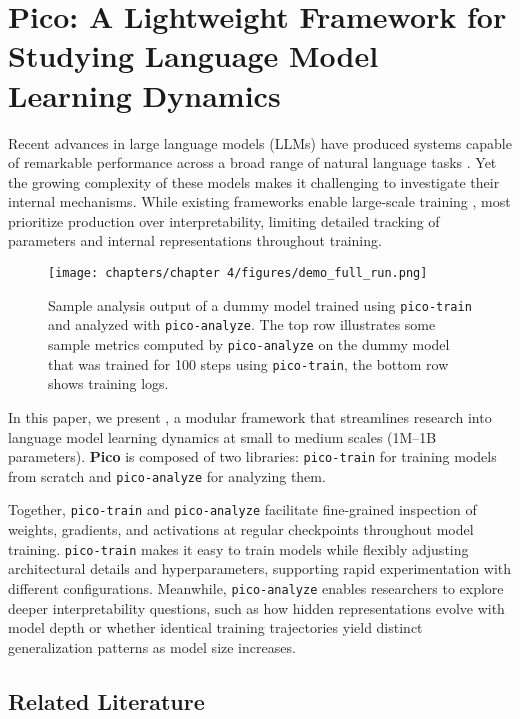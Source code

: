 \chapter{Pico: A Lightweight Framework for Studying Language Model Learning Dynamics}
\label{chapter:Pico}

Recent advances in large language models (LLMs) have produced systems capable of remarkable performance across a broad range of natural language tasks \citep{hendrycks2021mmlu, cobbe2021gsm8k, srivastava2023bigbench}. Yet the growing complexity of these models makes it challenging to investigate their internal mechanisms. While existing frameworks enable large-scale training \citep{rasley2020deepspeed, narayanan2021megatron}, most prioritize production over interpretability, limiting detailed tracking of parameters and internal representations throughout training.

\begin{figure}[t]
    \centering
    \texttt{[image: chapters/chapter 4/figures/demo\_full\_run.png]}
    \caption{Sample analysis output of a dummy model trained using \texttt{pico-train} and analyzed with \texttt{pico-analyze}. The top row illustrates some sample metrics computed by \texttt{pico-analyze} on the dummy model that was trained for 100 steps using \texttt{pico-train}, the bottom row shows training logs.}
    \label{fig:demo_full_run}
\end{figure}

In this paper, we present \pico, a modular framework that streamlines research into language model learning dynamics at small to medium scales (1M--1B parameters). \textbf{Pico} is composed of two libraries: \texttt{pico-train} for training models from scratch and \texttt{pico-analyze} for analyzing them. 

Together, \texttt{pico-train} and \texttt{pico-analyze} facilitate fine-grained inspection of weights, gradients, and activations at regular checkpoints throughout model training. \texttt{pico-train} makes it easy to train models while flexibly adjusting architectural details and hyperparameters, supporting rapid experimentation with different configurations. Meanwhile, \texttt{pico-analyze} enables researchers to explore deeper interpretability questions, such as how hidden representations evolve with model depth or whether identical training trajectories yield distinct generalization patterns as model size increases.


\section{Related Literature}
\label{sec:related}

